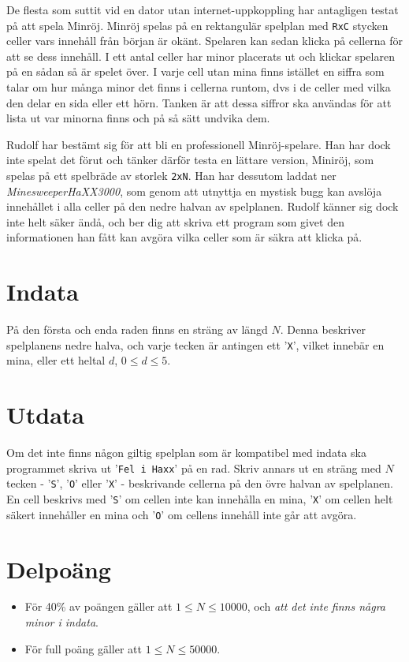 De flesta som suttit vid en dator utan internet-uppkoppling har antagligen testat på att spela Minröj. Minröj spelas på en rektangulär spelplan med \texttt{RxC} stycken celler vars innehåll från början är okänt. Spelaren kan sedan klicka på cellerna för att se dess innehåll. I ett antal celler har minor placerats ut och klickar spelaren på en sådan så är spelet över. I varje cell utan mina finns istället en siffra som talar om hur många minor det finns i cellerna runtom, dvs i de celler med vilka den delar en sida eller ett hörn. Tanken är att dessa siffror ska användas för att lista ut var minorna finns och på så sätt undvika dem.

Rudolf har bestämt sig för att bli en professionell Minröj-spelare. Han har dock inte spelat det förut och tänker därför testa en lättare version, Miniröj, som spelas på ett spelbräde av storlek \texttt{2xN}. Han har dessutom laddat ner \emph{MinesweeperHaXX3000}, som genom att utnyttja en mystisk bugg kan avslöja innehållet i alla celler på den nedre halvan av spelplanen. Rudolf känner sig dock inte helt säker ändå, och ber dig att skriva ett program som givet den informationen han fått kan avgöra vilka celler som är säkra att klicka på.

\section*{Indata}
På den första och enda raden finns en sträng av längd $N$. Denna beskriver spelplanens nedre halva, och varje tecken är antingen ett '\texttt{X}', vilket innebär en mina, eller ett heltal $d$, $0 \leq d \leq 5$.

\section*{Utdata}
Om det inte finns någon giltig spelplan som är kompatibel med indata ska programmet skriva ut '\texttt{Fel i Haxx}' på en rad. Skriv annars ut en sträng med $N$ tecken - '\texttt{S}', '\texttt{O}' eller '\texttt{X}' - beskrivande cellerna på den övre halvan av spelplanen. En cell beskrivs med '\texttt{S}' om cellen inte kan innehålla en mina, '\texttt{X}' om cellen helt säkert innehåller en mina och '\texttt{O}' om cellens innehåll inte går att avgöra.

\section*{Delpoäng}
\begin{itemize}
\item För 40\% av poängen gäller att $1 \leq N \leq 10 000$, och \emph{att det inte finns några minor i indata}.
\item För full poäng gäller att $1 \leq N \leq 50 000$.
\end{itemize}

